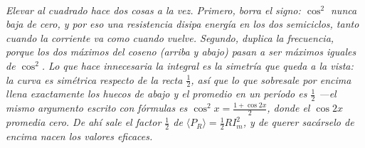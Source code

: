 \begin{center}
\\[0.5em]
{\small\itshape Elevar al cuadrado hace dos cosas a la vez. Primero, borra el
signo: $\cos^2$ nunca baja de cero, y por eso una resistencia disipa energía
en los dos semiciclos, tanto cuando la corriente va como cuando vuelve.
Segundo, duplica la frecuencia, porque los dos máximos del coseno (arriba y
abajo) pasan a ser máximos iguales de $\cos^2$. Lo que hace innecesaria la
integral es la simetría que queda a la vista: la curva es simétrica respecto de
la recta $\tfrac12$, así que lo que sobresale por encima llena exactamente los
huecos de abajo y el promedio en un período es $\tfrac12$ ---el mismo argumento
escrito con fórmulas es $\cos^2x = \tfrac{1+\cos 2x}{2}$, donde el $\cos 2x$
promedia cero. De ahí sale el factor $\tfrac12$ de $\langle P_R\rangle =
\tfrac12 R I_m^2$, y de querer sacárselo de encima nacen los valores eficaces.}
\end{center}
